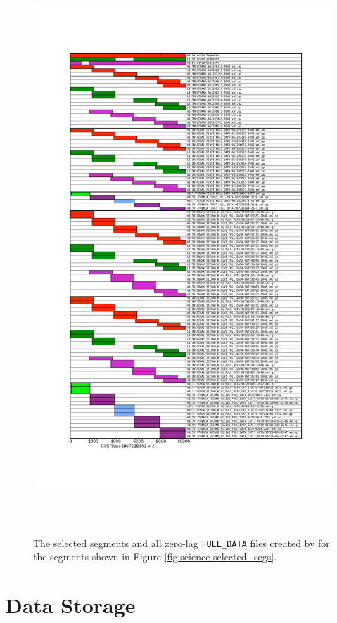 \begin{figure}[hp]
\center
\includegraphics[height=8.5in]{figures/segment_plot_selected_segs-thinca_second.pdf}
\caption{
The selected segments and all zero-lag \texttt{FULL\_DATA} files created by
\hipe for the segments shown in Figure \ref{fig:science-selected_segs}.}
\label{fig:segment_plot_full}
\end{figure}

\section{Data Storage}
\label{sec:data_storage}


